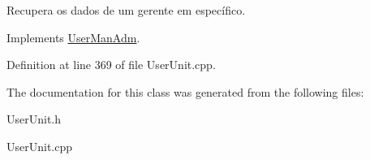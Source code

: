 Recupera os dados de um gerente em específico. 



Implements \hyperlink{classUserManAdm_a62e826d1c11061df021016e94e88f9ba}{User\-Man\-Adm}.



Definition at line 369 of file User\-Unit.\-cpp.



The documentation for this class was generated from the following files\-:\begin{DoxyCompactItemize}
\item 
User\-Unit.\-h\item 
User\-Unit.\-cpp\end{DoxyCompactItemize}
